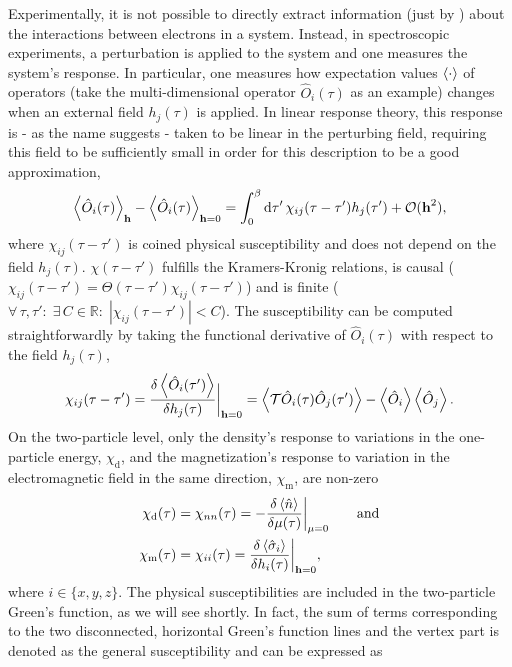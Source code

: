 \documentclass[../../main.tex]{subfiles}
\begin{document}
Experimentally, it is not possible to directly extract information (just by ) about the interactions between electrons in a system. Instead, in spectroscopic experiments, a perturbation is applied to the system and one measures the system's response. In particular, one measures how expectation values $\left\langle \cdot\right\rangle$ of operators (take the multi-dimensional operator $\hat O_{i}(\tau)$ as an example) changes when an external field $h_{j}(\tau)$ is applied. In linear response theory, this response is - as the name suggests - taken to be linear in the perturbing field, requiring this field to be sufficiently small in order for this description to be a good approximation,
\begin{align}
	\left\langle \hat O_{i}(\tau)\right\rangle_{\textbf{h}}-\left\langle \hat O_{i}(\tau)\right\rangle_{\textbf{h}=0}=\int_{0}^{\beta}\text{d}\tau'\, \chi_{ij}(\tau-\tau')h_{j}(\tau')+\mathcal{O}(\textbf{h}^2),
\end{align}
where $\chi_{ij}(\tau-\tau')$ is coined physical susceptibility and does not depend on the field $h_{j}(\tau)$. $\chi(\tau-\tau')$ fulfills the Kramers-Kronig relations, is causal ($\chi_{ij}(\tau-\tau')=\Theta(\tau-\tau')\chi_{ij}(\tau-\tau')$) and is finite ($\forall\, \tau,\tau':\;\exists\, C\in\mathbb{R}:\; |\chi_{ij}(\tau-\tau')|<C$). The susceptibility can be computed straightforwardly by taking the functional derivative of $\hat O_{i}(\tau)$ with respect to the field $h_{j}(\tau)$,
\begin{align}
	\chi_{ij}(\tau-\tau')=\frac{\delta \left\langle \hat O_{i}(\tau')\right\rangle}{\delta h_{j}(\tau)}\bigg|_{\textbf{h}=0}=\left\langle \mathcal{T}\hat O_{i}(\tau)\hat O_{j}(\tau')\right\rangle-\left\langle \hat O_{i}\right\rangle\left\langle \hat O_{j}\right\rangle.
\end{align}
On the two-particle level, only the density's response to variations in the one-particle energy, $\chi_{\text{d}}$, and the magnetization's response to variation in the electromagnetic field in the same direction, $\chi_{\text{m}}$, are non-zero
\begin{subequations}
\begin{align}
	\chi_{\text{d}}(\tau)&=\chi_{nn}(\tau)=-\frac{\delta \left\langle \hat n\right\rangle}{\delta \mu(\tau)}\bigg|_{\mu=0}\qquad\text{and}\label{eq:chi_dens_derivative}\\
	\chi_{\text{m}}(\tau)&=\chi_{ii}(\tau)=\frac{\delta \left\langle \hat\sigma_{i}\right\rangle}{\delta h_{i}(\tau)}\bigg|_{\textbf{h}=0},\label{eq:chi_magn_derivative}
\end{align}
\end{subequations}
where $i\in\{x,y,z\}$. The physical susceptibilities are included in the two-particle Green's function, as we will see shortly. In fact, the sum of terms corresponding to the two disconnected, horizontal Green's function lines and the vertex part is denoted as the general susceptibility and can be expressed as
\end{document}
